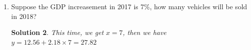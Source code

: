\documentclass{article}
\newtheorem*{Solution}{Solution}
\begin{document}
\begin{enumerate}
\begin{enumerate}
\begin{Solution}
    	    In this problem, we have
    	    \begin{equation}
    	  \mathbf{X}=\left[\begin{aligned}
    	  1~~~~6.2\\
    	  1~~~~6.5\\
    	  1~~~~5.48\\
    	  1~~~~6.54\\
    	  1~~~~7.18\\
    	  1~~~~7.93
    	  \end{aligned}\right],~y=\left[\begin{aligned}
    	  26.3\\26.65\\25.03\\26.01\\27.9\\30.47
    	  \end{aligned}\right]
    	    \end{equation}
    	    Then we have
    	    \begin{equation}
    	  \mathbf{X}^T\mathbf{X}=\left[\begin{aligned}
    	  6.0~~~~39.83~\\
    	  39.83~~~267.93
    	  \end{aligned}\right],~\mathbf{X}^Ty=\left[\begin{aligned}
    	  162.36\\1085.5
    	  \end{aligned}\right]
    	    \end{equation}
    	    So the solution of the equation is
    	    \begin{equation}
    	  \theta=\left[\begin{aligned}
    	  12.56\\2.18~
    	  \end{aligned}\right]\Rightarrow~y=12.56+2.18x
    	    \end{equation}
    	    \end{Solution}
    	    \item Suppose the GDP increasement in 2017 is 7\%, how many vehicles will be sold in 2018?
    	    \begin{Solution}
    	    This time, we get $x=7$, then we have $y=12.56+2.18\times7=27.82$
    	    \end{Solution}
    	\end{enumerate}
\end{enumerate}
\end{document}
